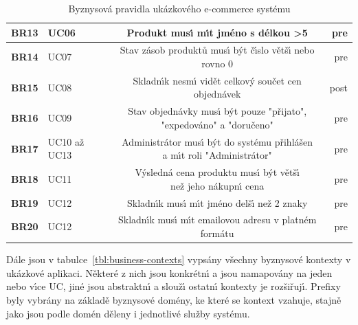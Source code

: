 \begin{table}
\begin{tabular}{ l l c r }
        \textbf{BR13} & UC06 & Produkt mus\'{\i} m\'{\i}t jméno s délkou >5 & pre \\ \hline
        \textbf{BR14} & UC07 & Stav zásob produktů mus\'{\i} b\'yt č\'{\i}slo větš\'{\i} nebo rovno 0 & pre \\ \hline
        \textbf{BR15} & UC08 & Skladn\'{\i}k nesm\'{\i} vidět celkov\'y součet cen objednávek & post \\ \hline
        \textbf{BR16} & UC09 & \makecell[c]{Stav objednávky mus\'{\i} b\'yt pouze "přijato", \\ "expedováno" a "doručeno"} & pre \\ \hline
        \textbf{BR17} & UC10 až UC13 & \makecell[c]{Administrátor mus\'{\i} b\'yt do systému přihlášen \\ a m\'{\i}t roli "Administrátor"} & pre \\ \hline
        \textbf{BR18} & UC11 & \makecell[c]{V\'ysledná cena produktu mus\'{\i} b\'yt větš\'{\i} \\ než jeho nákupn\'{\i} cena} & pre \\ \hline
        \textbf{BR19} & UC12 & Skladn\'{\i}k mus\'{\i} m\'{\i}t jméno delš\'{\i} než 2 znaky & pre \\ \hline
        \textbf{BR20} & UC12 & Skladn\'{\i}k mus\'{\i} m\'{\i}t emailovou adresu v platném formátu & pre \\
        \hline
    \end{tabular}
    \caption{Byznysová pravidla ukázkového e-commerce systému}
    \label{tbl:business-rules}
\end{table}

Dále jsou v tabulce~\ref{tbl:business-contexts} vypsány všechny byznysové kontexty v ukázkové aplikaci.
Některé z nich jsou konkrétn\'{\i} a jsou namapovány na jeden nebo v\'{\i}ce \gls{UC},
jiné jsou abstraktn\'{\i} a slouž\'{\i} ostatn\'{\i} kontexty je rozšiřuj\'{\i}.
Prefixy byly vybrány na základě byznysové domény, ke které se kontext vzahuje, stajně jako
jsou podle domén děleny i jednotlivé služby systému.

